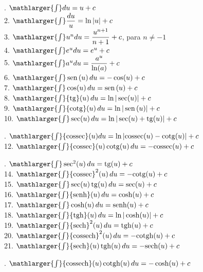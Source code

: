 \cleardoublepage\documentclass[../main.tex]{subfiles}
\begin{document}
\begin{multicols}{2}
. \(\mathlarger{\int} du = u+c\)\\
2. \(\mathlarger{\int} \dfrac{du}{u} =\ln|u|+c\)\\
3. \(\mathlarger{\int} u^n du = \dfrac{u^{n+1}}{n+1}+c\), para \(n\neq -1\)\\
4. \(\mathlarger{\int} e^u du =e^u+c\)\\
5. \(\mathlarger{\int} a^u du =\dfrac{a^u}{\ln (a)}+c\)\\
6. \(\mathlarger{\int} \sen(u) \,du = -\cos (u) +c\)\\
7. \(\mathlarger{\int} \cos (u)\, du = \sen (u) +c\)\\
8. \(\mathlarger{\int} {\rm tg} (u)\, du = \ln|\sec (u)|+c\)\\
9. \(\mathlarger{\int} {\rm cotg} (u)\, du = \ln|\sen (u)|+c\)\\
10. \(\mathlarger{\int} \sec (u)\, du = \ln|\sec (u) + {\rm tg} (u)|+c\)\\
\end{multicols}
. \(\mathlarger{\int} {\rm cossec} (u)du = \ln|{\rm cossec} (u) - {\rm cotg} (u)|+c\)\\
12. \(\mathlarger{\int} {\rm cossec} (u)\, {\rm cotg} (u)\,du = -{\rm cossec} (u)+c\)
\begin{multicols}{2}
. \(\mathlarger{\int} \sec^2 (u)\,du = {\rm tg} (u) +c\)\\
14. \(\mathlarger{\int} {\rm cossec}^2 (u)\,du =-{\rm cotg} (u) +c\)\\
15. \(\mathlarger{\int} \sec (u)\, {\rm tg} (u)\,du = \sec (u) +c\)\\
16. \(\mathlarger{\int} {\rm senh}(u)\, du = \cosh(u)+c\)\\
17. \(\mathlarger{\int} \cosh(u)\, du = {\rm senh}(u) +c\)\\
18. \(\mathlarger{\int} {\rm tgh} (u)\,du =\ln|\cosh(u)|+c\)\\
19. \(\mathlarger{\int} {\rm sech}^2 (u)\,du ={\rm tgh} (u) +c\)\\
20. \(\mathlarger{\int} {\rm cossech}^2(u)\,du =-{\rm cotgh} (u)+c\)\\
21. \(\mathlarger{\int} {\rm sech}(u) \, {\rm tgh} (u)\,du =-{\rm sech} (u)+c\)
\end{multicols}
. \(\mathlarger{\int} {\rm cossech}(u)\, {\rm cotgh} (u)\,du = -\cosh (u)+c\)
\end{document}
